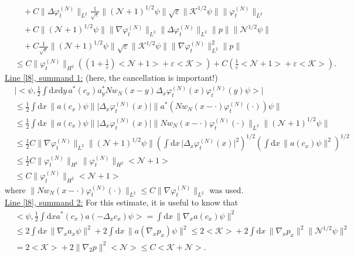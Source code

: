 \documentclass[11pt,a4paper,draft,DIV11]{scrartcl}	%
\newcommand{\di}{\textrm{d}}		%
\newcommand{\Ncal}{\mathcal{N}}		%
\newcommand{\Kcal}{\mathcal{K}}		%
\newcommand{\estlist}[2]{\underline{Line \ref{l#1}, summand #2:}}
\newcommand{\scal}[2]{\big<#1,#2\big>} %
\newcommand{\norm}[1]{\lVert#1\rVert}	%
\newcommand{\ev}[1]{\big<#1\big>}	%
\newcommand{\ph}{\varphi_t^{(N)}}	%
\newcommand{\gradone}{\nabla_2}
\begin{document}
\begin{align*}
& \quad + C\norm{\Delta \ph}_{L^2} \frac{1}{\sqrt{\varepsilon}} \norm{(\Ncal+1)^{1/2}\psi}  \sqrt{\varepsilon}\norm{\Kcal^{1/2}\psi} \norm{\ph}_{L^2} \\
& \quad + C \norm{(\Ncal+1)^{1/2}\psi} \norm{\nabla \ph}_{L^2} \norm{\Delta \ph}_{L^2} \norm{p} \norm{\Ncal^{1/2}\psi} \\
& \quad + C \frac{1}{\sqrt{\varepsilon}}\norm{(\Ncal+1)^{1/2}\psi} \sqrt{\varepsilon}\norm{\Kcal^{1/2}\psi} \norm{\nabla \ph}_{L^2}^2 \norm{p} \\
& \leq C \norm{\ph}_{H^2} \left( (1+\frac{1}{\varepsilon})\ev{\Ncal+1} + \varepsilon\ev{\Kcal} \right) + C \left( \frac{1}{\varepsilon}\ev{\Ncal+1} + \varepsilon \ev{\Kcal} \right).
\end{align*}
\estlist{8}{1} (here, the cancellation is important!)
\begin{align*}
&\lvert \scal{\psi}{\frac{1}{2}\int \di x\di y\,a^\ast(c_x) a^\ast_y N w_N(x-y) \Delta_x \ph(x) \ph(y) \psi}\rvert\\
& \leq \frac{1}{2} \int \di x\, \norm{a(c_x)\psi} \lvert \Delta_x \ph(x)\rvert \norm{a^\ast(Nw_N(x-\cdot)\ph(\cdot))\psi} \\
& \leq \frac{1}{2} \int \di x\, \norm{a(c_x)\psi} \lvert \Delta_x \ph(x)\rvert \norm{N w_N(x-\cdot)\ph(\cdot)}_{L^2} \norm{(\Ncal+1)^{1/2}\psi} \\
& \leq \frac{1}{2} C \norm{\nabla\ph}_{L^2} \norm{(\Ncal+1)^{1/2} \psi} \left( \int \di x\, \lvert \Delta_x \ph(x)\rvert^2 \right)^{1/2} \left( \int \di x\, \norm{a(c_x)\psi}^2 \right)^{1/2} \\
& \leq \frac{1}{2} C \norm{\ph}_{H^1} \norm{\ph}_{H^2} \ev{\Ncal+1} \\
& \leq C \norm{\ph}_{H^2} \ev{\Ncal+1}
\end{align*}
where $\norm{Nw_N(x-\cdot)\ph(\cdot)}_{L^2} \leq C\norm{\nabla \ph}_{L^2}$ was used.\\
\estlist{8}{2}
For this estimate, it is useful to know that
\begin{equation} \label{eq:bound1B}                                     
\begin{split}
 & \scal{\psi}{\frac{1}{2}\int \di x a^\ast(c_x) a(-\Delta_x c_x)\psi} = \int \di x\, \norm{\nabla_x a(c_x)\psi}^2 \\
 & \leq 2 \int \di x\, \norm{\nabla_x a_x \psi}^2 + 2\int \di x\, \norm{a(\nabla_x p_x)\psi}^2 \leq 2\ev{\Kcal} + 2\int \di x\, \norm{\nabla_x p_x}^2 \norm{\Ncal^{1/2}\psi}^2 \\
 & = 2\ev{\Kcal}+ 2\norm{\gradone p}^2 \ev{\Ncal} \leq C\ev{\Kcal + \Ncal}.
\end{split}
\end{equation}
\end{document}
